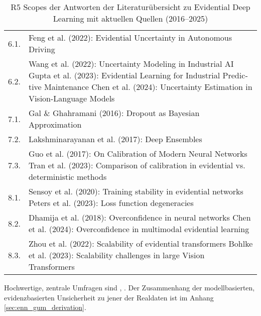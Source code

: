 \begin{otherlanguage}{ngerman}
\begin{table}[htbp]
\begin{tabularx}{\textwidth}{|l|X|}
6.1. & Feng et al. (2022): Evidential Uncertainty in Autonomous Driving \cite{feng2022review} \\ 
6.2. & Wang et al. (2022): Uncertainty Modeling in Industrial AI \cite{wang2022uncertainty} \newline
         Gupta et al. (2023): Evidential Learning for Industrial Predictive Maintenance \cite{gupta2023industrialedl} \newline
         Chen et al. (2024): Uncertainty Estimation in Vision-Language Models \cite{chen2024vlm} \\ \hline

7.1. & Gal \& Ghahramani (2016): Dropout as Bayesian Approximation \cite{gal2016dropout} \\ 
7.2. & Lakshminarayanan et al. (2017): Deep Ensembles \cite{lakshminarayanan2017simple} \\ 
7.3. & Guo et al. (2017): On Calibration of Modern Neural Networks \cite{guo2017calibration} \newline
         Tran et al. (2023): Comparison of calibration in evidential vs. deterministic methods \cite{tran2023separating} \\ \hline

8.1. & Sensoy et al. (2020): Training stability in evidential networks \cite{sensoy2020uncertainty} \newline
         Peters et al. (2023): Loss function degeneracies \cite{peters2023consistency} \\ 
8.2. & Dhamija et al. (2018): Overconfidence in neural networks \cite{dhamija2018reducing} \newline
         Chen et al. (2024): Overconfidence in multimodal evidential learning \cite{chen2024vlm} \\ 
8.3. & Zhou et al. (2022): Scalability of evidential transformers \cite{zhou2022evidential} \newline
         Bohlke et al. (2023): Scalability challenges in large Vision Transformers \cite{bohlke2023evidentialvit} \\ \hline

\end{tabularx}
\caption{R5 Scopes der Antworten der Literaturübersicht zu Evidential Deep Learning mit aktuellen Quellen (2016–2025)}
\label{tab:edl_scopes_sources_updated}
\end{table}
\newline
Hochwertige, zentrale Umfragen sind \parencite{Ulmer2023}, \parencite{Gawlikowski2023}. 
\newline
Der Zusammenhang der modellbasierten, evidenzbasierten Unsicherheit zu jener der Realdaten ist im Anhang \ref{sec:enn_gum_derivation}.


\end{otherlanguage}

